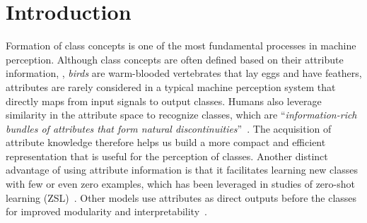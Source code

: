
\savespacebeforesection

\section{Introduction}
\savespacebeforesection
Formation of class concepts is one of the most fundamental processes in machine
perception. Although class concepts are often defined based on their attribute
information, \eg, \emph{birds} are warm-blooded vertebrates that lay eggs and
have feathers, attributes are rarely considered in a typical machine perception
system that directly maps from input signals to output classes. Humans also
leverage similarity in the attribute space to recognize classes, which are
``\emph{information-rich bundles of attributes that form natural
discontinuities}''~\citep{roschmervis1975family}. The acquisition of attribute
knowledge therefore helps us build a more compact and efficient representation
that is useful for the perception of classes.
Another distinct advantage of using attribute information is that it
facilitates learning new classes with few or even zero examples, which has been
leveraged in studies of zero-shot learning (ZSL)~\citep{zsl,attributezsl,czsl}.
Other models use attributes as direct outputs before the classes for improved
modularity and interpretability~\citep{farhadi2009describe,koh2020concept}. 




